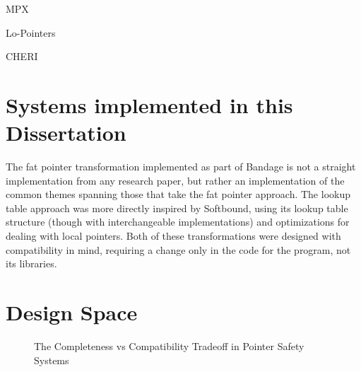 MPX

Lo-Pointers

CHERI

\section{Systems implemented in this Dissertation}

The fat pointer transformation implemented as part of Bandage is not a straight implementation from any research paper, but rather an implementation of the common themes spanning those that take the fat pointer approach.
The lookup table approach was more directly inspired by Softbound, using its lookup table structure (though with interchangeable implementations) and optimizations for dealing with local pointers.
Both of these transformations were designed with compatibility in mind, requiring a change only in the code for the program, not its libraries.

\section{Design Space}

\begin{figure}
\centering
{}
\caption{The Completeness vs Compatibility Tradeoff in Pointer Safety Systems}
\label{fig:Spectrum}
\end{figure}

